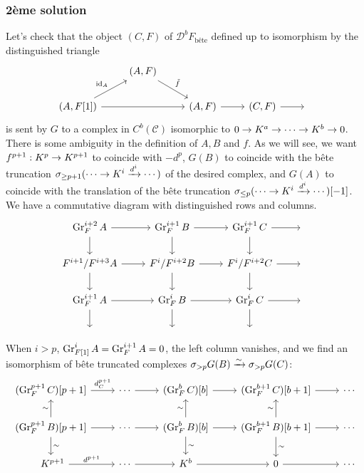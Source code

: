 \documentclass[deligne.tex]{subfiles}
\begin{document}
\subsubsection*{2ème solution}
Let's check that the object $(C,F)$ of $\mathcal D^bF_{\text{b\^ete}}$ 
defined up to isomorphism by the distinguished triangle
\begin{equation*}\begin{tikzcd}
	&(A,F)\arrow[dr,"\tilde f"] \\
	(A,F[1])\arrow[ur,"\id_A"]\arrow[rr]&&(A,F)\arrow[r]&(C,F)\arrow[r]&\;
\end{tikzcd}\end{equation*}
is sent by $G$ to a complex in $C^b(\mathcal C)$ isomorphic to
$0\rightarrow K^a\rightarrow\cdots\rightarrow K^b\rightarrow0$.
There is some ambiguity in the definition of $A,B$ and $f$. As we will see,
we want $f^{p+1}:K^p\rightarrow K^{p+1}$ to coincide with $-d^p$, $G(B)$ to 
coincide with the bête truncation
$\sigma_{\geq p+1}(\cdots\rightarrow K^i\xrightarrow{d^i}\cdots)$ of the desired
complex, and $G(A)$ to coincide with the translation of the bête truncation 
$\sigma_{\leq p}(\cdots\rightarrow K^i\xrightarrow{d^i}\cdots)[-1]$.
We have a commutative diagram with distinguished rows and columns.
\begin{equation*}\begin{tikzcd}
	\Gr_F^{i+2}A\arrow[r]\arrow[d]
	&\Gr_F^{i+1}B\arrow[r]\arrow[d]
	&\Gr_F^{i+1}C\arrow[r]\arrow[d]&\; \\
	F^{i+1}/F^{i+3}A\arrow[r]\arrow[d]
	&F^i/F^{i+2}B\arrow[r]\arrow[d]
	&F^i/F^{i+2}C\arrow[r]\arrow[d]&\; \\
	\Gr_F^{i+1}A\arrow[r]\arrow[d]
	&\Gr^i_FB\arrow[r]\arrow[d]
	&\Gr_F^iC\arrow[r]\arrow[d]&\; \\
	\;&\;&\;
\end{tikzcd}\end{equation*}
When $i>p$, $\operatorname{Gr}_{F[1]}^iA=\operatorname{Gr}_F^{i+1}A=0$, the left column vanishes, and
we find an isomorphism of bête truncated complexes
$\sigma_{>p}G(B)\xrightarrow\sim\sigma_{>p}G(C)$:
\begin{equation*}\begin{tikzcd}
	(\Gr_F^{p+1}C)[p+1]\arrow[r,"d_C^{p+1}"]
	&\cdots\arrow[r]&(\Gr_F^{b}C)[b]\arrow[r] 
	&(\Gr_F^{b+1}C)[b+1]\arrow[r]
	&\cdots \\
	(\Gr_F^{p+1}B)[p+1]\arrow[r]\arrow[u,"\sim"]\arrow[d,"\sim"]
	&\cdots\arrow[r]
	&(\Gr_F^{b}B)[b]\arrow[r]\arrow[u,"\sim"]\arrow[d,"\sim"]
	&(\Gr_F^{b+1}B)[b+1]\arrow[r]\arrow[u,"\sim"]\arrow[d,"\sim"]
	&\cdots \\\
	K^{p+1}\arrow[r,"d^{p+1}"]&\cdots\arrow[r]
	&K^b\arrow[r]&0\arrow[r]&\cdots
\end{tikzcd}\end{equation*}
\end{document}
